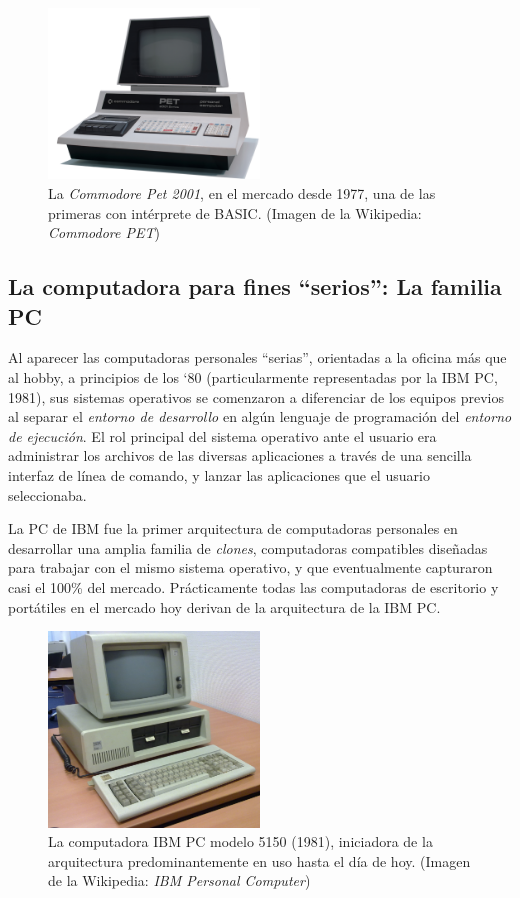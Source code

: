 \documentclass[11pt,fleqn]{book} %
\begin{document}
\begin{figure}[htb]
\centering
\includegraphics[width=0.5\textwidth]{./img/commodore_pet.jpg}
\caption{\label{INTRO_commodore_pet}La \emph{Commodore Pet 2001}, en el mercado desde 1977, una de las primeras con intérprete de BASIC. (Imagen de la Wikipedia: \emph{Commodore PET})}
\end{figure}
\subsection{La computadora para fines ``serios'': La familia PC}
\label{sec-1-4-3}


Al aparecer las computadoras personales ``serias'', orientadas a la
oficina más que al hobby, a principios de los `80 (particularmente
representadas por la IBM PC, 1981), sus sistemas operativos se
comenzaron a diferenciar de los equipos previos al separar el \emph{entorno de desarrollo} en algún lenguaje de programación del \emph{entorno de ejecución}. El rol principal del sistema operativo ante el usuario era
administrar los archivos de las diversas aplicaciones a
través de una sencilla interfaz de línea de comando, y lanzar las
aplicaciones que el usuario seleccionaba.

La PC de IBM fue la primer arquitectura de computadoras personales en
desarrollar una amplia familia de \emph{clones}, computadoras compatibles
diseñadas para trabajar con el mismo sistema operativo, y que
eventualmente capturaron casi el 100\% del
mercado. Prácticamente todas las computadoras de escritorio y
portátiles en el mercado hoy derivan de la arquitectura de la IBM PC.

\begin{figure}[htb]
\centering
\includegraphics[width=0.5\textwidth]{./img/ibmpc.jpg}
\caption{\label{INTRO_ibmpc}La computadora IBM PC modelo 5150 (1981), iniciadora de la arquitectura predominantemente en uso hasta el día de hoy. (Imagen de la Wikipedia: \emph{IBM Personal Computer})}
\end{figure}
\end{document}
